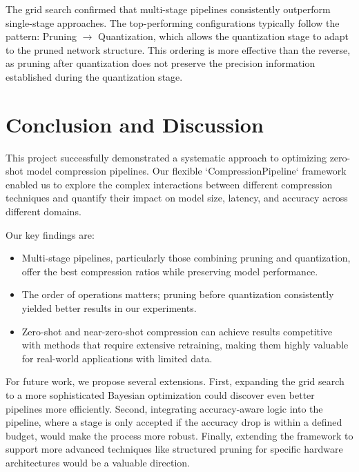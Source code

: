\documentclass[sigconf]{acmart}
\begin{document}
The grid search confirmed that multi-stage pipelines consistently outperform single-stage approaches. The top-performing configurations typically follow the pattern: Pruning $\rightarrow$ Quantization, which allows the quantization stage to adapt to the pruned network structure. This ordering is more effective than the reverse, as pruning after quantization does not preserve the precision information established during the quantization stage.

\section{Conclusion and Discussion}
This project successfully demonstrated a systematic approach to optimizing zero-shot model compression pipelines. Our flexible `CompressionPipeline` framework enabled us to explore the complex interactions between different compression techniques and quantify their impact on model size, latency, and accuracy across different domains.

Our key findings are:
\begin{itemize}
    \item Multi-stage pipelines, particularly those combining pruning and quantization, offer the best compression ratios while preserving model performance.
    \item The order of operations matters; pruning before quantization consistently yielded better results in our experiments.
    \item Zero-shot and near-zero-shot compression can achieve results competitive with methods that require extensive retraining, making them highly valuable for real-world applications with limited data.
\end{itemize}

For future work, we propose several extensions. First, expanding the grid search to a more sophisticated Bayesian optimization could discover even better pipelines more efficiently. Second, integrating accuracy-aware logic into the pipeline, where a stage is only accepted if the accuracy drop is within a defined budget, would make the process more robust. Finally, extending the framework to support more advanced techniques like structured pruning for specific hardware architectures would be a valuable direction.


 
\end{document}
